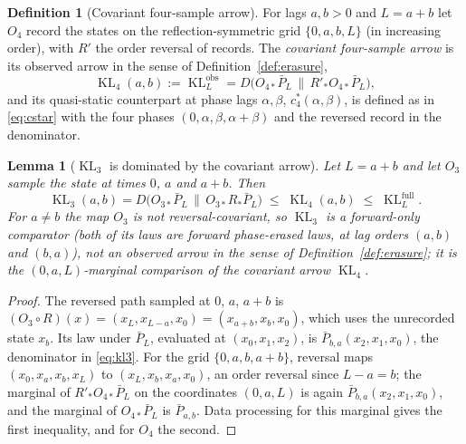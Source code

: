 \documentclass[10pt]{article}
\newtheorem{lemma}[theorem]{Lemma}
\theoremstyle{definition}
\newtheorem{definition}[theorem]{Definition}
\DeclareMathOperator{\KL}{KL}
\newcommand{\Pbar}{\bar P}
\newcommand{\Rrec}{R'}
\begin{document}
\begin{definition}[Covariant four-sample arrow]
\label{def:kl4}
For lags $a,b>0$ and $L=a+b$ let $O_4$ record the states on the
reflection-symmetric grid $\{0,a,b,L\}$ (in increasing order), with
$\Rrec$ the order reversal of records.  The \emph{covariant four-sample
arrow} is its observed arrow in the sense of
Definition~\ref{def:erasure},
\[
\KL_4(a,b):=\KL^{\mathrm{obs}}_L
=D\bigl(O_{4*}\Pbar_L\,\big\|\,\Rrec_*O_{4*}\Pbar_L\bigr),
\]
and its quasi-static counterpart at phase lags $\alpha,\beta$,
$c_4^*(\alpha,\beta)$, is defined as in \eqref{eq:cstar} with the four
phases $(0,\alpha,\beta,\alpha+\beta)$ and the reversed record in the
denominator.
\end{definition}

\begin{lemma}[$\KL_3$ is dominated by the covariant arrow]
\label{lem:kl3-observed}
Let $L=a+b$ and let $O_3$ sample the state at times $0$, $a$ and $a+b$.
Then
\[
\KL_3(a,b)=D\bigl(O_{3*}\Pbar_L\,\|\,O_{3*}R_*\Pbar_L\bigr)\;\leq\;\KL_4(a,b)\;\leq\;\KL^{\mathrm{full}}_L .
\]
For $a\neq b$ the map $O_3$ is not reversal-covariant, so $\KL_3$ is a
forward-only comparator (both of its laws are forward phase-erased laws,
at lag orders $(a,b)$ and $(b,a)$), not an observed arrow in the sense of
Definition~\ref{def:erasure}; it is the $(0,a,L)$-marginal comparison of
the covariant arrow $\KL_4$.
\end{lemma}

\begin{proof}
The reversed path sampled at $0$, $a$, $a+b$ is
$(O_3\circ R)(x)=(x_L,x_{L-a},x_0)=(x_{a+b},x_b,x_0)$, which uses the
unrecorded state $x_b$.  Its law under $\Pbar_L$, evaluated at
$(x_0,x_1,x_2)$, is $\Pbar_{b,a}(x_2,x_1,x_0)$, the denominator in
\eqref{eq:kl3}.  For the grid $\{0,a,b,a+b\}$, reversal maps
$(x_0,x_a,x_b,x_L)$ to $(x_L,x_b,x_a,x_0)$, an order reversal since
$L-a=b$; the marginal of $\Rrec_*O_{4*}\Pbar_L$ on the coordinates
$(0,a,L)$ is again $\Pbar_{b,a}(x_2,x_1,x_0)$, and the marginal of
$O_{4*}\Pbar_L$ is $\Pbar_{a,b}$.  Data processing for this marginal gives
the first inequality, and for $O_4$ the second.
\end{proof}
\end{document}
